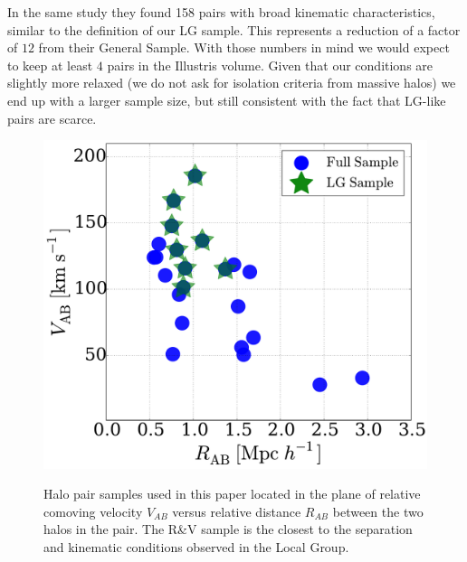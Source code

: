 \documentclass{emulateapj}
\begin{document}
In the same study they found 158 pairs with broad kinematic
characteristics, similar to the definition of our LG sample. 
This represents a reduction of a factor of $12$ from their General
Sample. 
With those numbers in mind we would expect to keep at least $4$ pairs
in the Illustris volume. 
Given that our conditions are slightly more relaxed (we do not ask for
isolation criteria from massive halos) we end up with a larger sample
size, but still consistent with the fact that LG-like pairs are
scarce.  






\begin{figure}
\centering
\includegraphics[width=\hsize]{v_r_pairs.pdf}\\
\caption{Halo pair samples used in this paper located in the
  plane of relative comoving velocity $V_{AB}$ versus relative
  distance $R_{AB}$ between the two halos in the pair.
  The R\&V sample is the closest to the separation and kinematic
  conditions observed in the Local Group.} 
\label{fig:samples}
\end{figure}

\end{document}
